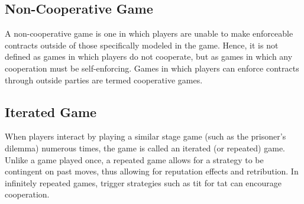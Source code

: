 \documentclass[]{report}
\begin{document}
\subsection{Non-Cooperative Game}
A non-cooperative game is one in which players are unable to make enforceable contracts outside of those specifically modeled in the game. Hence, it is not defined as games in which players do not cooperate, but as games in which any cooperation must be self-enforcing. Games in which players can enforce contracts through outside parties are termed cooperative games.
\subsection{Iterated Game}
When players interact by playing a similar stage game (such as the prisoner's dilemma) numerous times, the game is called an iterated (or repeated) game. Unlike a game played once, a repeated game allows for a strategy to be contingent on past moves, thus allowing for reputation effects and retribution. In infinitely repeated games, trigger strategies such as tit for tat can encourage cooperation.
\end{document}

